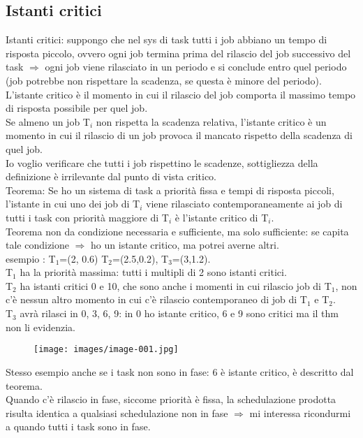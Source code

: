 \documentclass[12pt, oneside]{extbook}
\begin{document}
\subsection{Istanti critici}
Istanti critici: suppongo che nel sys di task tutti i job abbiano un tempo di risposta piccolo, ovvero ogni job termina prima del rilascio del job successivo del task $\Rightarrow$ ogni job viene rilasciato in un periodo e si conclude entro quel periodo (job potrebbe non rispettare la scadenza, se questa è minore del periodo).\\ L'istante critico è il momento in cui il rilascio del job comporta il massimo tempo di risposta possibile  per quel job.\\ Se almeno un job T$_{i}$ non rispetta la scadenza relativa, l'istante critico è un momento in cui il rilascio di un job provoca il mancato rispetto della scadenza di quel job.\\ Io voglio verificare che tutti i job rispettino le scadenze, sottigliezza della definizione è irrilevante dal punto di vista critico.\\ Teorema: Se ho un sistema di task a priorità fissa e tempi di risposta piccoli, l'istante in cui uno dei job di T$_{i}$  viene rilasciato contemporaneamente ai job di tutti i task con priorità maggiore di T$_{i}$ è l'istante critico di T$_{i}$.\\ Teorema non da condizione necessaria e sufficiente, ma solo sufficiente: se capita tale condizione $\Rightarrow$ ho un istante critico, ma potrei averne altri.\\ esempio : T$_{1}$=(2, 0.6) T$_{2}$=(2.5,0.2), T$_{3}$=(3,1.2).\\ T$_{1}$ ha la priorità massima: tutti i multipli di 2 sono istanti critici.\\ T$_{2}$ ha istanti critici 0 e 10, che sono anche i momenti in cui rilascio job di T$_{1}$, non c'è nessun altro momento in cui c'è rilascio contemporaneo di job di T$_{1}$ e T$_{2}$.\\ T$_{3}$ avrà rilasci in 0, 3, 6, 9: in 0 ho istante critico, 6 e 9 sono critici ma il thm non li evidenzia.\\
\begin{figure}[!h]
\centering
\texttt{[image: images/image-001.jpg]}
\end{figure}
Stesso esempio anche se i task non sono in fase: 6 è istante critico, è descritto dal teorema.\\ Quando c'è rilascio in fase, siccome priorità è fissa, la schedulazione prodotta risulta identica a qualsiasi schedulazione non in fase $\Rightarrow$ mi interessa ricondurmi a quando tutti i task sono in fase.
\end{document}
